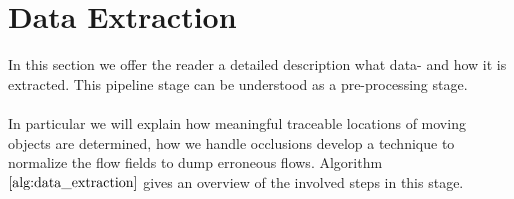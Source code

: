 %


\section{Data Extraction}
In this section we offer the reader a detailed description what data- and how it is extracted. This pipeline stage can be understood as a pre-processing stage. \\ \\
In particular we will explain how meaningful traceable locations of moving objects are determined, how we handle occlusions develop a technique to normalize the flow fields to dump erroneous flows. Algorithm $\ref{alg:data_extraction}$ gives an overview of the involved steps in this stage.
